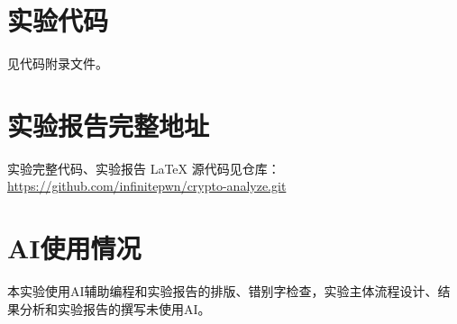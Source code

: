 \clearpage
\appendix
\section{实验代码}
见代码附录文件。%

% 

% 
\section{实验报告完整地址}
实验完整代码、实验报告 \LaTeX{} 源代码见仓库：
\url{https://github.com/infinitepwn/crypto-analyze.git}


\section{AI使用情况}
本实验使用AI辅助编程和实验报告的排版、错别字检查，实验主体流程设计、结果分析和实验报告的撰写未使用AI。